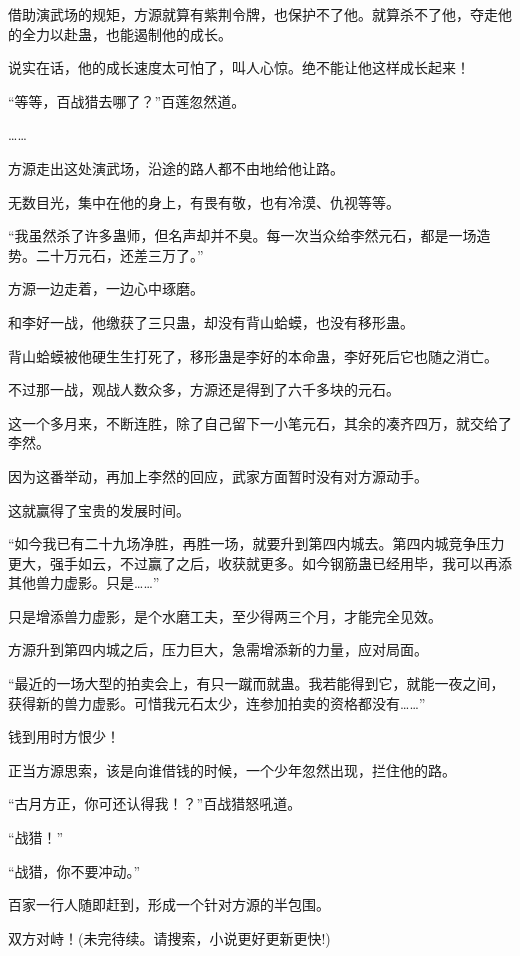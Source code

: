 \begin{this_body}
借助演武场的规矩，方源就算有紫荆令牌，也保护不了他。就算杀不了他，夺走他的全力以赴蛊，也能遏制他的成长。

说实在话，他的成长速度太可怕了，叫人心惊。绝不能让他这样成长起来！

“等等，百战猎去哪了？”百莲忽然道。

……

方源走出这处演武场，沿途的路人都不由地给他让路。

无数目光，集中在他的身上，有畏有敬，也有冷漠、仇视等等。

“我虽然杀了许多蛊师，但名声却并不臭。每一次当众给李然元石，都是一场造势。二十万元石，还差三万了。”

方源一边走着，一边心中琢磨。

和李好一战，他缴获了三只蛊，却没有背山蛤蟆，也没有移形蛊。

背山蛤蟆被他硬生生打死了，移形蛊是李好的本命蛊，李好死后它也随之消亡。

不过那一战，观战人数众多，方源还是得到了六千多块的元石。

这一个多月来，不断连胜，除了自己留下一小笔元石，其余的凑齐四万，就交给了李然。

因为这番举动，再加上李然的回应，武家方面暂时没有对方源动手。

这就赢得了宝贵的发展时间。

“如今我已有二十九场净胜，再胜一场，就要升到第四内城去。第四内城竞争压力更大，强手如云，不过赢了之后，收获就更多。如今钢筋蛊已经用毕，我可以再添其他兽力虚影。只是……”

只是增添兽力虚影，是个水磨工夫，至少得两三个月，才能完全见效。

方源升到第四内城之后，压力巨大，急需增添新的力量，应对局面。

“最近的一场大型的拍卖会上，有只一蹴而就蛊。我若能得到它，就能一夜之间，获得新的兽力虚影。可惜我元石太少，连参加拍卖的资格都没有……”

钱到用时方恨少！

正当方源思索，该是向谁借钱的时候，一个少年忽然出现，拦住他的路。

“古月方正，你可还认得我！？”百战猎怒吼道。

“战猎！”

“战猎，你不要冲动。”

百家一行人随即赶到，形成一个针对方源的半包围。

双方对峙！(未完待续。请搜索，小说更好更新更快!)

\end{this_body}

